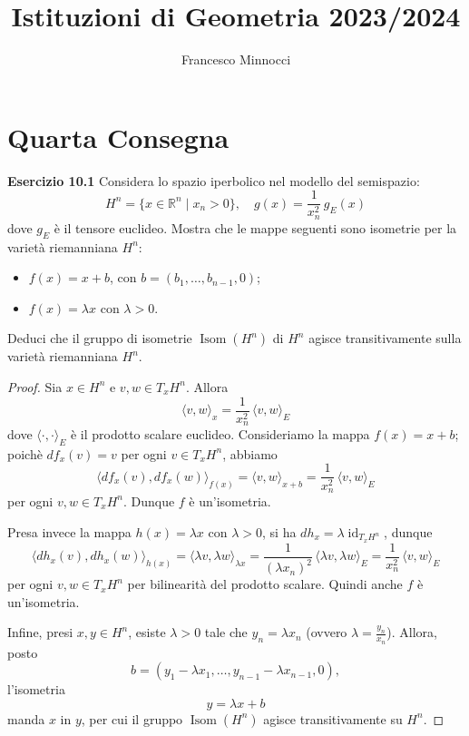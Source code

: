 \documentclass[a4paper]{article}
\title{Istituzioni di Geometria 2023/2024}
\author{Francesco Minnocci}
\newcommand{\R}{\mathbb{R}}
\newcommand{\id}{\operatorname{id}}
\theoremstyle{definition}
\theoremstyle{definition}
\theoremstyle{remark}
\theoremstyle{definition}
\begin{document}
\maketitle
\section*{Quarta Consegna}
\textbf{Esercizio 10.1}
Considera lo spazio iperbolico nel modello del semispazio:
\[
    H^n = \{x \in \R^n \mid x_n > 0\}, \quad g(x) = \frac{1}{x_n^2} \, g_E(x)
\]
dove $g_E$ è il tensore euclideo. Mostra che le mappe seguenti sono isometrie per la varietà riemanniana $H^n$:
\begin{itemize}
    \item $f(x) = x + b$, con $b = (b_1, \ldots, b_{n-1}, 0)$;
    \item $f(x) = \lambda x$ con $\lambda > 0$.
\end{itemize}
Deduci che il gruppo di isometrie $\operatorname{Isom}(H^n)$ di $H^n$ agisce transitivamente sulla varietà riemanniana $H^n$.

\begin{proof}
    Sia $x \in H^n$ e $v, w \in T_xH^n$. Allora
    \[
        \langle v, w \rangle_x = \frac{1}{x_n^2} \, \langle v, w \rangle_E
    \]
    dove $\langle \cdot, \cdot \rangle_E$ è il prodotto scalare euclideo. Consideriamo la mappa $f(x) = x + b$; poichè $df_x(v) = v$ per ogni $v \in T_xH^n$, abbiamo
    \[
        \langle df_x(v), df_x(w) \rangle_{f(x)} = \langle v, w \rangle_{x + b} = \frac{1}{x_n^2} \, \langle v, w \rangle_E
    \]
    per ogni $v, w \in T_xH^n$. Dunque $f$ è un'isometria.

    Presa invece la mappa $h(x) = \lambda x$ con $\lambda > 0$, si ha $dh_x= \lambda \id_{T_xH^n}$, dunque
    \[
        \langle dh_x(v), dh_x(w) \rangle_{h(x)} = \langle \lambda v, \lambda w \rangle_{\lambda x} = \frac{1}{(\lambda x_n)^2} \, \langle \lambda v, \lambda w \rangle_E = \frac{1}{x_n^2} \, \langle v, w \rangle_E
    \]
    per ogni $v, w \in T_xH^n$ per bilinearità del prodotto scalare. Quindi anche $f$ è un'isometria.

    Infine, presi $x, y \in H^n$, esiste $\lambda > 0$ tale che $y_n = \lambda x_n$ (ovvero $\lambda = \frac{y_n}{x_n}$).
    Allora, posto \[b=(y_1 - \lambda x_1, \ldots, y_{n-1} - \lambda x_{n-1}, 0),\] l'isometria \[y = \lambda x + b\] manda $x$ in $y$, per cui il gruppo $\operatorname{Isom}(H^n)$ agisce transitivamente su $H^n$.
\end{proof}
\end{document}
